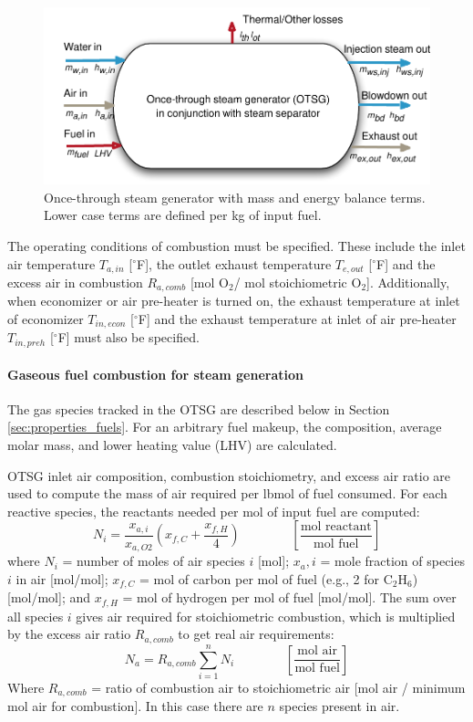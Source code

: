 \documentclass[11pt]{report}
\newcommand{\eqnunitfrac}[2]{\quad\quad \scriptstyle{\left[\frac{\text{#1}}{\text{#2}}\right]}}
\begin{document}
\begin{figure}[t]
\includegraphics[width=1\columnwidth]{images/OTSG.pdf}
\caption{Once-through steam generator with mass and energy balance terms. Lower case terms are defined per kg of input fuel.}
\label{fig:OTSG}
\end{figure}

The operating conditions of combustion must be specified. These include the inlet air temperature $T_{a,in}$ [$^\circ$F], the outlet exhaust temperature $T_{e,out}$ [$^\circ$F] and the excess air in combustion $R_{a,comb}$ [mol O$_2$/ mol stoichiometric O$_2$]. Additionally, when economizer or air pre-heater is turned on, the exhaust temperature at inlet of economizer $T_{in,econ}$ [$^\circ$F] and the exhaust temperature at inlet of air pre-heater $T_{in,preh}$ [$^\circ$F] must also be specified.

\paragraph{Gaseous fuel combustion for steam generation}

The gas species tracked in the OTSG are described below in Section \ref{sec:properties_fuels}. For an arbitrary fuel makeup, the composition, average molar mass, and lower heating value (LHV) are calculated.

OTSG inlet air composition, combustion stoichiometry, and excess air ratio are used to compute the mass of air required per lbmol of fuel consumed. For each reactive species, the reactants needed per mol of input fuel are computed: 
\begin{equation}\label{eq:steam_N_stoich_comb}
N_i = \frac{x_{a,i}}{x_{a,O2}}\left({x_{f,C} +\frac{x_{f,H}}{4}}\right) \quad\quad\eqnunitfrac{mol reactant}{mol fuel}
\end{equation}
where $N_i$ = number of moles of air species $i$ [mol]; $x_a,i$ = mole fraction of species $i$ in air [mol/mol]; $x_{f,C}$ = mol of carbon per mol of fuel (e.g., 2 for C$_2$H$_6$) [mol/mol]; and $x_{f,H}$ = mol of hydrogen per mol of fuel [mol/mol]. The sum over all species $i$ gives air required for stoichiometric combustion, which is multiplied by the excess air ratio $R_{a,comb}$ to get real air requirements:
\begin{equation}\label{eq:steam_N_real_comb}
N_{a} = R_{a,comb}\sum_{i=1}^{n} N_i \quad\quad\eqnunitfrac{mol air}{mol fuel}
\end{equation}
Where $R_{a,comb}$ = ratio of combustion air to stoichiometric air [mol air / minimum mol air for combustion]. In this case there are $n$ species present in air.
\end{document}
